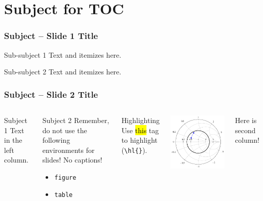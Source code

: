 \section{Subject for TOC}
\begin{frame}
    \frametitle{Subject -- Slide 1 Title}
    \begin{block}{Sub-subject 1}
        Text and itemizes here.
    \end{block}
    \begin{block}{Sub-subject 2}
        Text and itemizes here.
    \end{block}
\end{frame}

\begin{frame}[fragile]
    \frametitle{Subject -- Slide 2 Title}
    \begin{columns}[onlytextwidth,t]
        \begin{block}{Subject 1}
            Text in the left column.
        \end{block}
        \begin{block}{Subject 2}
            Remember, do not use the following environments for slides! No captions!
            \begin{itemize}
                \item \texttt{figure}
                \item \texttt{table}
            \end{itemize}
        \end{block}
        \begin{block}{Highlighting}
            Use \hl{this} tag to highlight (\verb|\hl{}|).
        \end{block}

        \begin{center}
            \includegraphics[scale=0.7]{img/smithchart}
        \end{center}
        Here is second column!
    \end{columns}
\end{frame}

